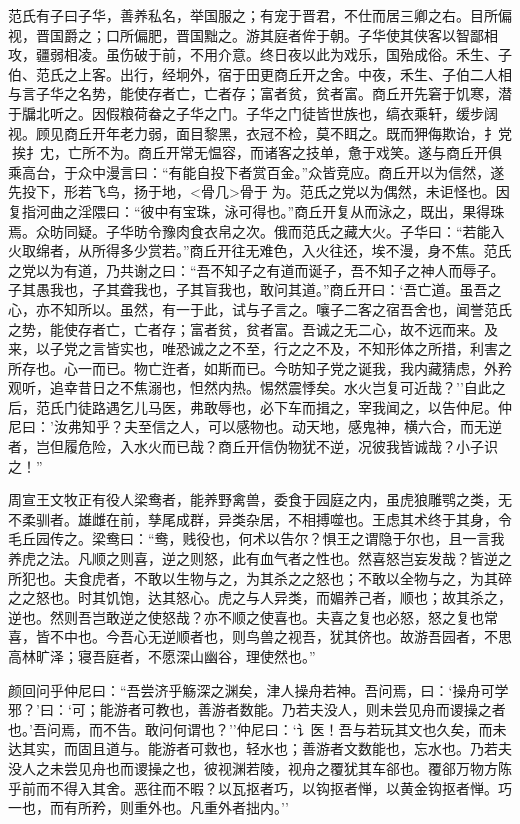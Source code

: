 \documentclass[]{article}
\begin{document}
范氏有子曰子华，善养私名，举国服之；有宠于晋君，不仕而居三卿之右。目所偏视，晋国爵之；口所偏肥，晋国黜之。游其庭者侔于朝。子华使其侠客以智鄙相攻，疆弱相凌。虽伤破于前，不用介意。终日夜以此为戏乐，国殆成俗。禾生、子伯、范氏之上客。出行，经坰外，宿于田更商丘开之舍。中夜，禾生、子伯二人相与言子华之名势，能使存者亡，亡者存；富者贫，贫者富。商丘开先窘于饥寒，潜于牖北听之。因假粮荷畚之子华之门。子华之门徒皆世族也，缟衣乘轩，缓步阔视。顾见商丘开年老力弱，面目黎黑，衣冠不检，莫不眲之。既而狎侮欺诒，扌党挨扌冘，亡所不为。商丘开常无愠容，而诸客之技单，惫于戏笑。遂与商丘开俱乘高台，于众中漫言曰：``有能自投下者赏百金。''众皆竞应。商丘开以为信然，遂先投下，形若飞鸟，扬于地，\textless{}骨几\textgreater{}骨于为。范氏之党以为偶然，未讵怪也。因复指河曲之淫隈曰：``彼中有宝珠，泳可得也。''商丘开复从而泳之，既出，果得珠焉。众昉同疑。子华昉令豫肉食衣帛之次。俄而范氏之藏大火。子华曰：``若能入火取绵者，从所得多少赏若。''商丘开往无难色，入火往还，埃不漫，身不焦。范氏之党以为有道，乃共谢之曰：``吾不知子之有道而诞子，吾不知子之神人而辱子。子其愚我也，子其聋我也，子其盲我也，敢问其道。''商丘开曰：`吾亡道。虽吾之心，亦不知所以。虽然，有一于此，试与子言之。嚷子二客之宿吾舍也，闻誉范氏之势，能使存者亡，亡者存；富者贫，贫者富。吾诚之无二心，故不远而来。及来，以子党之言皆实也，唯恐诚之之不至，行之之不及，不知形体之所措，利害之所存也。心一而已。物亡迕者，如斯而已。今昉知子党之诞我，我内藏猜虑，外矜观听，追幸昔日之不焦溺也，怛然内热。惕然震悸矣。水火岂复可近哉？''自此之后，范氏门徒路遇乞儿马医，弗敢辱也，必下车而揖之，宰我闻之，以告仲尼。仲尼曰：'汝弗知乎？夫至信之人，可以感物也。动天地，感鬼神，横六合，而无逆者，岂但履危险，入水火而已哉？商丘开信伪物犹不逆，况彼我皆诚哉？小子识之！''

周宣王文牧正有役人梁鸯者，能养野禽兽，委食于园庭之内，虽虎狼雕鹗之类，无不柔驯者。雄雌在前，孳尾成群，异类杂居，不相搏噬也。王虑其术终于其身，令毛丘园传之。梁鸯曰：``鸯，贱役也，何术以告尔？惧王之谓隐于尔也，且一言我养虎之法。凡顺之则喜，逆之则怒，此有血气者之性也。然喜怒岂妄发哉？皆逆之所犯也。夫食虎者，不敢以生物与之，为其杀之之怒也；不敢以全物与之，为其碎之之怒也。时其饥饱，达其怒心。虎之与人异类，而媚养己者，顺也；故其杀之，逆也。然则吾岂敢逆之使怒哉？亦不顺之使喜也。夫喜之复也必怒，怒之复也常喜，皆不中也。今吾心无逆顺者也，则鸟兽之视吾，犹其侪也。故游吾园者，不思高林旷泽；寝吾庭者，不愿深山幽谷，理使然也。''

颜回问乎仲尼曰：``吾尝济乎觞深之渊矣，津人操舟若神。吾问焉，曰：`操舟可学邪？'曰：`可；能游者可教也，善游者数能。乃若夫没人，则未尝见舟而谡操之者也。'吾问焉，而不告。敢问何谓也？''仲尼曰：`讠医！吾与若玩其文也久矣，而未达其实，而固且道与。能游者可救也，轻水也；善游者文数能也，忘水也。乃若夫没人之未尝见舟也而谡操之也，彼视渊若陵，视舟之覆犹其车郤也。覆郤万物方陈乎前而不得入其舍。恶往而不暇？以瓦抠者巧，以钩抠者惮，以黄金钩抠者惮。巧一也，而有所矜，则重外也。凡重外者拙内。''
\end{document}
